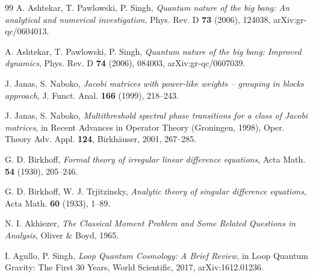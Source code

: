 \documentclass[11pt]{amsart}
\theoremstyle{remark}
\begin{document}
\begin{thebibliography}{99}
 A. Ashtekar, T. Pawlowski, P. Singh, \emph{Quantum nature of the big bang: An analytical and numerical investigation}, Phys. Rev. D \textbf{73} (2006), 124038, arXiv:gr-qc/0604013.

 A. Ashtekar, T. Pawlowski, P. Singh, \emph{Quantum nature of the big bang: Improved dynamics}, Phys. Rev. D \textbf{74} (2006), 084003, arXiv:gr-qc/0607039.

 J. Janas, S. Naboko, \emph{Jacobi matrices with power-like weights -- grouping in blocks approach}, J. Funct. Anal. \textbf{166} (1999), 218--243.

 J. Janas, S. Naboko, \emph{Multithreshold spectral phase transitions for a class of Jacobi matrices}, in Recent Advances in Operator Theory (Groningen, 1998), Oper. Theory Adv. Appl. \textbf{124}, Birkh\"auser, 2001, 267--285.

 G. D. Birkhoff, \emph{Formal theory of irregular linear difference equations}, Acta Math. \textbf{54} (1930), 205--246.

 G. D. Birkhoff, W. J. Trjitzinsky, \emph{Analytic theory of singular difference equations}, Acta Math. \textbf{60} (1933), 1--89.

 N. I. Akhiezer, \emph{The Classical Moment Problem and Some Related Questions in Analysis}, Oliver \& Boyd, 1965.

 I. Agullo, P. Singh, \emph{Loop Quantum Cosmology: A Brief Review}, in Loop Quantum Gravity: The First 30 Years, World Scientific, 2017, arXiv:1612.01236.

\end{thebibliography}
\end{document}
